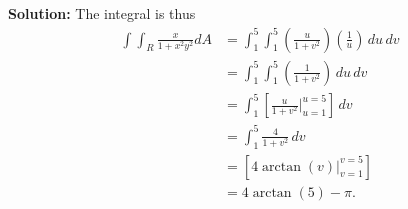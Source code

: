 \documentclass[12pt,oneside]{exam}
\newenvironment{newsolution}{\vspace{.1in}\noindent\textbf{Solution: \hspace{.05em}}}{}
\begin{document}
\begin{newsolution}
The integral is thus 
\begin{align*}
\int \int_{R} \frac{x}{1+x^2y^2} dA & = \int_{1}^{5} \int_{1}^{5} \left(\frac{u}{1+v^2}\right)\left(\frac{1}{u}\right) \, du \, dv\\
& = \int_{1}^{5} \int_{1}^{5} \left(\frac{1}{1+v^2}\right) \, du \, dv\\
& = \int_{1}^{5} \left[ \frac{u}{1+v^2} \Big|_{u=1}^{u=5} \right] \, dv \\
& = \int_{1}^{5} \frac{4}{1+v^2} \, dv \\
& = \left[4\arctan(v) \Big|_{v=1}^{v=5} \right] \\
& = 4\arctan(5)-\pi.
\end{align*}
\end{newsolution}
\end{document}
